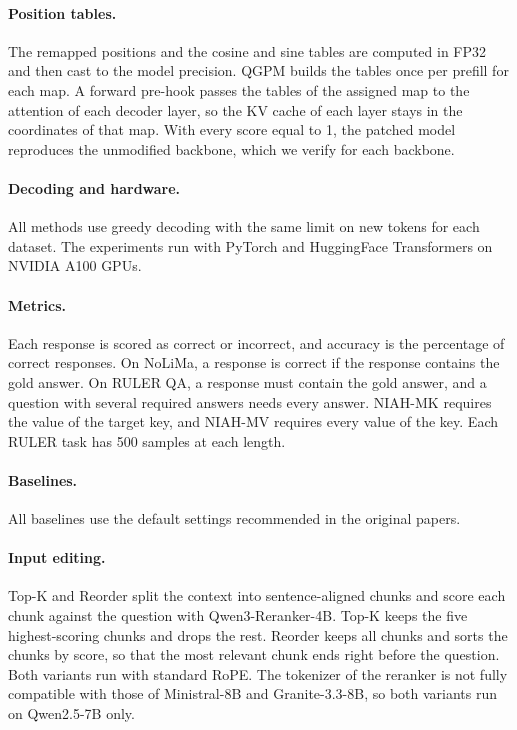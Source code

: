 \documentclass[11pt]{article}
\begin{document}
\paragraph{Position tables.}
The remapped positions and the cosine and sine tables are computed in FP32 and then cast to the model precision. QGPM builds the tables once per prefill for each map. A forward pre-hook passes the tables of the assigned map to the attention of each decoder layer, so the KV cache of each layer stays in the coordinates of that map. With every score equal to 1, the patched model reproduces the unmodified backbone, which we verify for each backbone.

\paragraph{Decoding and hardware.}
All methods use greedy decoding with the same limit on new tokens for each dataset. The experiments run with PyTorch and HuggingFace Transformers on NVIDIA A100 GPUs.

\paragraph{Metrics.}
Each response is scored as correct or incorrect, and accuracy is the percentage of correct responses. On NoLiMa, a response is correct if the response contains the gold answer. On RULER QA, a response must contain the gold answer, and a question with several required answers needs every answer. NIAH-MK requires the value of the target key, and NIAH-MV requires every value of the key. Each RULER task has 500 samples at each length.

\paragraph{Baselines.}
All baselines use the default settings recommended in the original papers.

\paragraph{Input editing.}
Top-K and Reorder split the context into sentence-aligned chunks and score each chunk against the question with Qwen3-Reranker-4B. Top-K keeps the five highest-scoring chunks and drops the rest. Reorder keeps all chunks and sorts the chunks by score, so that the most relevant chunk ends right before the question. Both variants run with standard RoPE. The tokenizer of the reranker is not fully compatible with those of Ministral-8B and Granite-3.3-8B, so both variants run on Qwen2.5-7B only.
\end{document}
